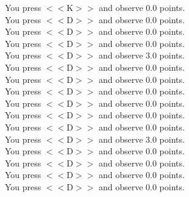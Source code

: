 \documentclass[pdflatex,sn-nature]{sn-jnl}%
\theoremstyle{thmstyleone}%
\theoremstyle{thmstyletwo}%
\theoremstyle{thmstylethree}%
\begin{document}
You press $<<$K$>>$ and observe 0.0 points. $~$\\ 
You press $<<$D$>>$ and observe 0.0 points. $~$\\ 
You press $<<$D$>>$ and observe 0.0 points. $~$\\ 
You press $<<$D$>>$ and observe 0.0 points. $~$\\ 
You press $<<$D$>>$ and observe 3.0 points. $~$\\ 
You press $<<$D$>>$ and observe 0.0 points. $~$\\ 
You press $<<$D$>>$ and observe 0.0 points. $~$\\ 
You press $<<$D$>>$ and observe 0.0 points. $~$\\ 
You press $<<$D$>>$ and observe 0.0 points. $~$\\ 
You press $<<$D$>>$ and observe 0.0 points. $~$\\ 
You press $<<$D$>>$ and observe 0.0 points. $~$\\ 
You press $<<$D$>>$ and observe 3.0 points. $~$\\ 
You press $<<$D$>>$ and observe 0.0 points. $~$\\ 
You press $<<$D$>>$ and observe 0.0 points. $~$\\ 
You press $<<$D$>>$ and observe 0.0 points. $~$\\ 
You press $<<$D$>>$ and observe 0.0 points.
\end{document}
